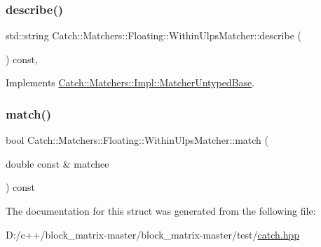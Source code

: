 \subsubsection{\texorpdfstring{describe()}{describe()}}
{\footnotesize\ttfamily std\+::string Catch\+::\+Matchers\+::\+Floating\+::\+Within\+Ulps\+Matcher\+::describe (\begin{DoxyParamCaption}{ }\end{DoxyParamCaption}) const\hspace{0.3cm}{\ttfamily [override]}, {\ttfamily [virtual]}}



Implements \mbox{\hyperlink{class_catch_1_1_matchers_1_1_impl_1_1_matcher_untyped_base_a91d3a907dbfcbb596077df24f6e11fe2}{Catch\+::\+Matchers\+::\+Impl\+::\+Matcher\+Untyped\+Base}}.

\mbox{\label{struct_catch_1_1_matchers_1_1_floating_1_1_within_ulps_matcher_aabda42a0dc5d00f3c5916feb75006b32}} 
\subsubsection{\texorpdfstring{match()}{match()}}
{\footnotesize\ttfamily bool Catch\+::\+Matchers\+::\+Floating\+::\+Within\+Ulps\+Matcher\+::match (\begin{DoxyParamCaption}\item[{double const \&}]{matchee }\end{DoxyParamCaption}) const\hspace{0.3cm}{\ttfamily [override]}}



The documentation for this struct was generated from the following file\+:\begin{DoxyCompactItemize}
\item 
D\+:/c++/block\+\_\+matrix-\/master/block\+\_\+matrix-\/master/test/\mbox{\hyperlink{catch_8hpp}{catch.\+hpp}}\end{DoxyCompactItemize}
